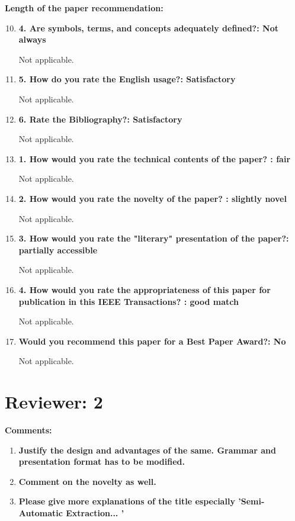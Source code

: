 \documentclass[12pt]{article}
\begin{document}
\textbf{Length of the paper recommendation:}

\begin{enumerate}
\setcounter{enumi}{9}
\item \textbf{4. Are symbols, terms, and concepts adequately defined?: Not always}

Not applicable.

\item \textbf{5. How do you rate the English usage?: Satisfactory}

Not applicable.

\item \textbf{6. Rate the Bibliography?: Satisfactory}

Not applicable.

\item \textbf{1. How would you rate the technical contents of the paper? : fair}

Not applicable.

\item \textbf{2. How would you rate the novelty of the paper? : slightly novel}

Not applicable.

\item \textbf{3. How would you rate the "literary" presentation of the paper?: partially 
accessible}

Not applicable.

\item \textbf{4. How would you rate the appropriateness of this paper for publication in 
this IEEE Transactions? : good match}

Not applicable.

\item \textbf{Would you recommend this paper for a Best Paper Award?: No}

Not applicable.

\end{enumerate}


\section*{Reviewer: 2}

\textbf{Comments:}

\begin{enumerate}

\item \textbf{Justify the design and advantages of the same. Grammar and presentation 
format has to be modified.}

\item \textbf{Comment on the novelty as well.}

\item \textbf{Please give more explanations of the title especially 'Semi-Automatic 
Extraction... '}

\end{enumerate}
\end{document}
